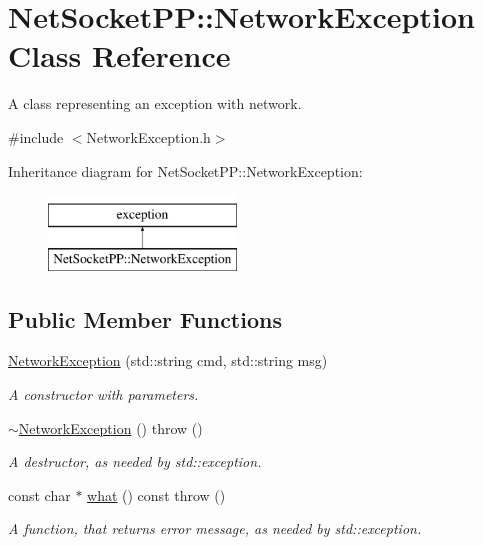 \hypertarget{class_net_socket_p_p_1_1_network_exception}{\section{Net\-Socket\-P\-P\-:\-:Network\-Exception Class Reference}
\label{class_net_socket_p_p_1_1_network_exception}
}


A class representing an exception with network.  




{\ttfamily \#include $<$Network\-Exception.\-h$>$}

Inheritance diagram for Net\-Socket\-P\-P\-:\-:Network\-Exception\-:\begin{figure}[H]
\begin{center}
\leavevmode
\includegraphics[height=2.000000cm]{class_net_socket_p_p_1_1_network_exception}
\end{center}
\end{figure}
\subsection*{Public Member Functions}
\begin{DoxyCompactItemize}
\item 
\hyperlink{class_net_socket_p_p_1_1_network_exception_a94885d8a86f44db4b88aa5555c38522a}{Network\-Exception} (std\-::string cmd, std\-::string msg)
\begin{DoxyCompactList}\small\item\em A constructor with parameters. \end{DoxyCompactList}\item 
\hypertarget{class_net_socket_p_p_1_1_network_exception_aa47fb62f0baafdc4c158757f533a0d55}{\hyperlink{class_net_socket_p_p_1_1_network_exception_aa47fb62f0baafdc4c158757f533a0d55}{$\sim$\-Network\-Exception} ()  throw ()}\label{class_net_socket_p_p_1_1_network_exception_aa47fb62f0baafdc4c158757f533a0d55}

\begin{DoxyCompactList}\small\item\em A destructor, as needed by std\-::exception. \end{DoxyCompactList}\item 
const char $\ast$ \hyperlink{class_net_socket_p_p_1_1_network_exception_a1ad0c99178e80ffb1432a7a3804cbd05}{what} () const   throw ()
\begin{DoxyCompactList}\small\item\em A function, that returns error message, as needed by std\-::exception. \end{DoxyCompactList}\end{DoxyCompactItemize}


